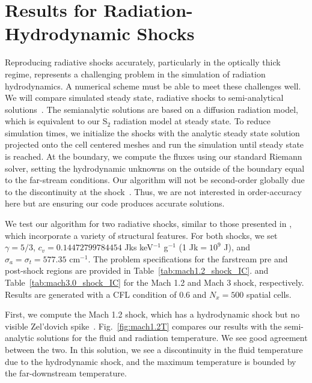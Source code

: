 \documentclass[preprint,12pt]{elsarticle}
\begin{document}
\section{Results for Radiation-Hydrodynamic Shocks}
\label{sec:ShockSolutions}

Reproducing radiative shocks accurately, particularly in the optically thick
regime, represents a challenging problem in the simulation of radiation
hydrodynamics. A numerical scheme must be able to meet these
challenges well.  We will compare simulated steady state, radiative shocks to semi-analytical solutions~\cite{jim???}. The
semianalytic solutions are based on a diffusion radiation model, which is equivalent to our S$_2$ radiation model at steady state.
To reduce simulation times, we initialize the shocks with the analytic steady state solution projected onto the cell centered meshes
and run the simulation until steady state is reached.
At the boundary, we compute the fluxes using our
standard Riemann solver, setting the hydrodynamic unknowns on the outside of the boundary equal to the far-stream conditions.  
Our algorithm will not be second-order globally due to the discontinuity at the shock~\cite{???}.  Thus, we are not interested in
order-accuracy here but are ensuring our code produces accurate solutions.

We test our algorithm for two radiative shocks, similar to those presented in
\cite{lowrie3}, which incorporate a variety of structural features.  For both shocks, we set $\gamma = 5/3$,
$c_v=0.14472799784454$ Jks keV$^{-1}$ g$^{-1}$ (1 Jk$=10^9$ J), and $\sigma_a = \sigma_t = 577.35$ cm$^{-1}$. 
The problem specifications for the farstream pre and post-shock regions are provided in Table~\ref{tab:mach1.2_shock_IC}.
and Table~\ref{tab:mach3.0_shock_IC} for the Mach 1.2 and Mach 3 shock, respectively.
Results are generated with a CFL condition of 0.6 and $N_x=500$ spatial cells.

First, we compute the Mach 1.2 shock, which has a hydrodynamic shock but no
visible Zel'dovich spike~\cite{jim???}.  Fig.~\ref{fig:mach1.2T} compares our
results with the semi-analytic solutions for the fluid and
radiation temperature.  We see good agreement between
the two.  In this solution, we see a discontinuity in the fluid temperature due to the hydrodynamic shock, 
and the maximum temperature is bounded by the far-downstream temperature.
\end{document}
